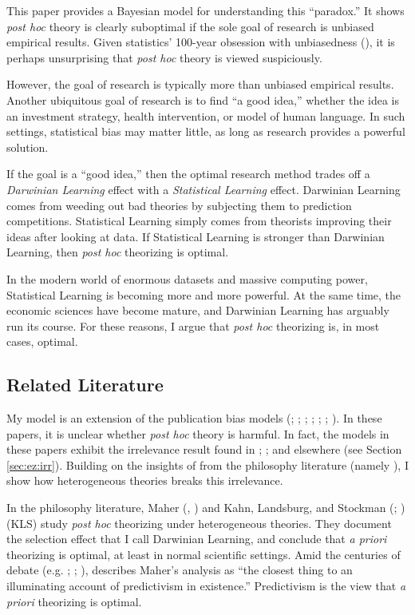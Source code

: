 \documentclass[12pt,english]{article}
\theoremstyle{plain}
\theoremstyle{plain}
\begin{document}
This paper provides a Bayesian model for understanding this ``paradox.'' It shows \emph{post hoc} theory is clearly suboptimal if the sole goal of research is unbiased empirical results. Given statistics' 100-year obsession with unbiasedness (\citet{efron2001statistical}), it is perhaps unsurprising that \emph{post hoc} theory is viewed suspiciously.

However, the goal of research is typically more than unbiased empirical results. Another ubiquitous goal of research is to find ``a good idea,'' whether the idea is an investment strategy, health intervention, or model of human language. In such settings, statistical bias may matter little, as long as research provides a powerful solution.

If the goal is a ``good idea,'' then the optimal research method trades off a \emph{Darwinian Learning} effect with a \emph{Statistical Learning} effect. Darwinian Learning comes from weeding out bad theories by subjecting them to prediction competitions. Statistical Learning simply comes from theorists improving their ideas after looking at data. If Statistical Learning is stronger than Darwinian Learning, then \emph{post hoc} theorizing is optimal.

In the modern world of enormous datasets and massive computing power, Statistical Learning is becoming more and more powerful. At the same time, the economic sciences have become mature, and Darwinian Learning has arguably run its course. For these reasons, I argue that \emph{post hoc} theorizing is, in most cases, optimal.

\subsection{Related Literature}

My model is an extension of the publication bias models (\citet{hedges1984estimation}; \citet{brodeur2016star}; \citet{andrews2019identification}; \citet{abadie2020statistical}; \citet{chen2020publication}; \citet{jensen2023there}; \citet{kasy2024optimal}). In these papers, it is unclear whether \emph{post hoc} theory is harmful. In fact, the models in these papers exhibit the irrelevance result found in \citet{hempel1966philosophy}; \citet{lakatos1970methodology}; and elsewhere (see Section \ref{sec:ez:irr}). Building on the insights of from the philosophy literature (namely \citealt{maher1988prediction}), I show how heterogeneous theories breaks this irrelevance. 

In the philosophy literature, Maher (\citeyear{maher1988prediction}, \citeyear{maher1990prediction}) and Kahn, Landsburg, and Stockman (\citeyear{kahn1992novel}; \citeyear{kahn1996positive}) (KLS) study \emph{post hoc} theorizing under heterogeneous theories. They document the selection effect that I call Darwinian Learning, and conclude that \emph{a priori} theorizing is optimal, at least in normal scientific settings. Amid the centuries of  debate  (e.g. \citet{leibniz1678letter}; \citet{newton1726scholium}; \citet{keynes1921treatise}), \citet{barnes1996discussion} describes Maher's analysis as ``the closest thing to an illuminating account of predictivism in existence.'' Predictivism is the view that \emph{a priori} theorizing is optimal.
\end{document}
